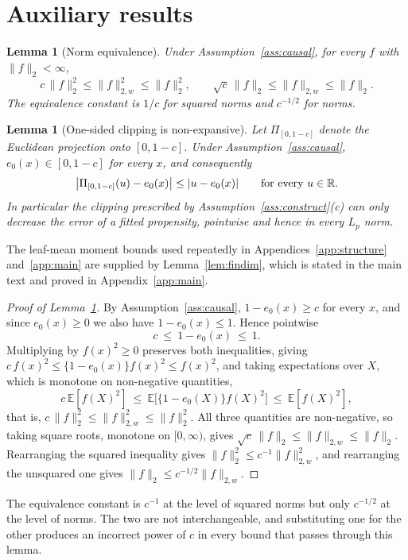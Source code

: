 \documentclass[11pt]{article}
\theoremstyle{plain}
\newtheorem{lemma}[theorem]{Lemma}
\theoremstyle{definition}
\theoremstyle{remark}
\newcommand{\E}{\mathbb{E}}
\newcommand{\R}{\mathbb{R}}
\newcommand{\ez}{e_0}
\newcommand{\Ltwo}[1]{\lVert #1 \rVert_{2}}
\newcommand{\Lw}[1]{\lVert #1 \rVert_{2,w}}
\DeclarePairedDelimiter{\abs}{\lvert}{\rvert}
\begin{document}
\section{Auxiliary results}\label{app:aux}

\begin{lemma}[Norm equivalence]\label{lem:normequiv}
Under Assumption~\ref{ass:causal}, for every $f$ with $\Ltwo f<\infty$,
\[
  c\,\Ltwo f^2\le\Lw f^2\le\Ltwo f^2,
  \qquad
  \sqrt c\,\Ltwo f\le\Lw f\le\Ltwo f .
\]
The equivalence constant is $1/c$ for squared norms and $c^{-1/2}$ for norms.
\end{lemma}

\begin{lemma}[One-sided clipping is non-expansive]\label{lem:clip}
Let $\Pi_{[0,1-c]}$ denote the Euclidean projection onto $[0,1-c]$. Under
Assumption~\ref{ass:causal}, $\ez(x)\in[0,1-c]$ for every $x$, and consequently
\[
  \bigl\lvert\Pi_{[0,1-c]}(u)-\ez(x)\bigr\rvert\le\abs{u-\ez(x)}
  \qquad\text{for every }u\in\R .
\]
In particular the clipping prescribed by Assumption~\ref{ass:construct}(c) can
only decrease the error of a fitted propensity, pointwise and hence in every
$L_p$ norm.
\end{lemma}

\noindent The leaf-mean moment bounds used repeatedly in
Appendices~\ref{app:structure} and~\ref{app:main} are supplied by
Lemma~\ref{lem:findim}, which is stated in the main text and proved in
Appendix~\ref{app:main}.

\begin{proof}[Proof of Lemma~\ref{lem:normequiv}]
By Assumption~\ref{ass:causal}, $1-\ez(x)\ge c$ for every $x$, and since
$\ez(x)\ge0$ we also have $1-\ez(x)\le1$. Hence pointwise
\[
  c\ \le\ 1-\ez(x)\ \le\ 1 .
\]
Multiplying by $f(x)^2\ge0$ preserves both inequalities, giving
$c\,f(x)^2\le\{1-\ez(x)\}f(x)^2\le f(x)^2$, and taking expectations over $X$,
which is monotone on non-negative quantities,
\[
  c\,\E[f(X)^2]\ \le\ \E\bigl[\{1-\ez(X)\}f(X)^2\bigr]\ \le\ \E[f(X)^2],
\]
that is, $c\,\Ltwo f^2\le\Lw f^2\le\Ltwo f^2$. All three quantities are
non-negative, so taking square roots, monotone on $[0,\infty)$, gives
$\sqrt c\,\Ltwo f\le\Lw f\le\Ltwo f$. Rearranging the squared inequality gives
$\Ltwo f^2\le c^{-1}\Lw f^2$, and rearranging the unsquared one gives
$\Ltwo f\le c^{-1/2}\Lw f$.
\end{proof}

\noindent The equivalence constant is $c^{-1}$ at the level of squared norms but
only $c^{-1/2}$ at the level of norms. The two are not interchangeable, and
substituting one for the other produces an incorrect power of $c$ in every
bound that passes through this lemma.
\end{document}
